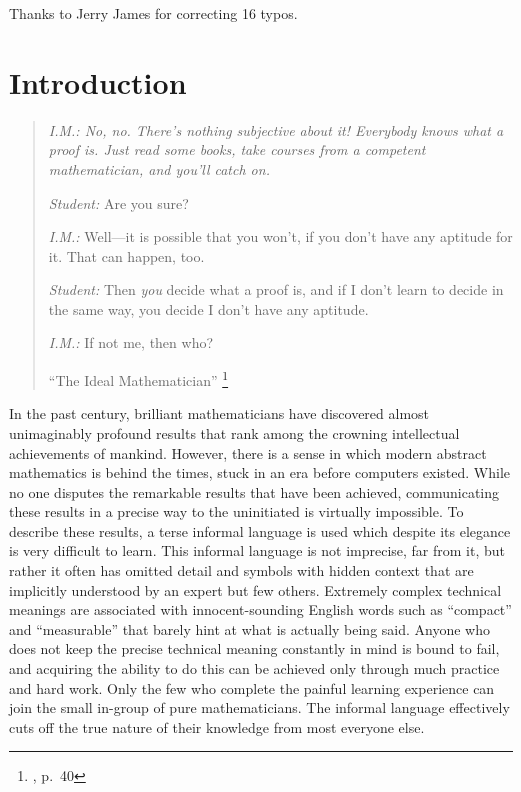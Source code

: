 Thanks to Jerry James for correcting 16 typos.

\chapter{Introduction}

\begin{quotation}
  {\em {\em I.M.:}  No, no.  There's nothing subjective about it!  Everybody
knows what a proof is.  Just read some books, take courses from a competent
mathematician, and you'll catch on.

{\em Student:}  Are you sure?

{\em I.M.:}  Well---it is possible that you won't, if you don't have any
aptitude for it.  That can happen, too.

{\em Student:}  Then {\em you} decide what a proof is, and if I don't learn
to decide in the same way, you decide I don't have any aptitude.

{\em I.M.:}  If not me, then who?}
    \flushright\sc  ``The Ideal Mathematician''
    \footnote{\cite{Davis}, p.~40}\\
\end{quotation}

In the past century, brilliant mathematicians have discovered almost
unimaginably profound results that rank among the crowning intellectual
achievements of mankind.  However, there is a sense in which modern abstract
mathematics is behind the times, stuck in an era before computers existed.
While no one disputes the remarkable results that have been achieved,
communicating these results in a precise way to the uninitiated is virtually
impossible.  To describe these results, a terse informal language is used which
despite its elegance is very difficult to learn.  This informal language is not
imprecise, far from it, but rather it often has omitted detail
and symbols with hidden context that are
implicitly understood by an expert but few others.  Extremely complex technical
meanings are associated with innocent-sounding English words such as
``compact'' and ``measurable'' that barely hint at what is actually being
said.  Anyone who does not keep the precise technical meaning constantly in
mind is bound to fail, and acquiring the ability to do this can be achieved
only through much practice and hard work.  Only the few who complete the
painful learning experience can join the small in-group of pure
mathematicians.  The informal language effectively cuts off the true nature of
their knowledge from most everyone else.

